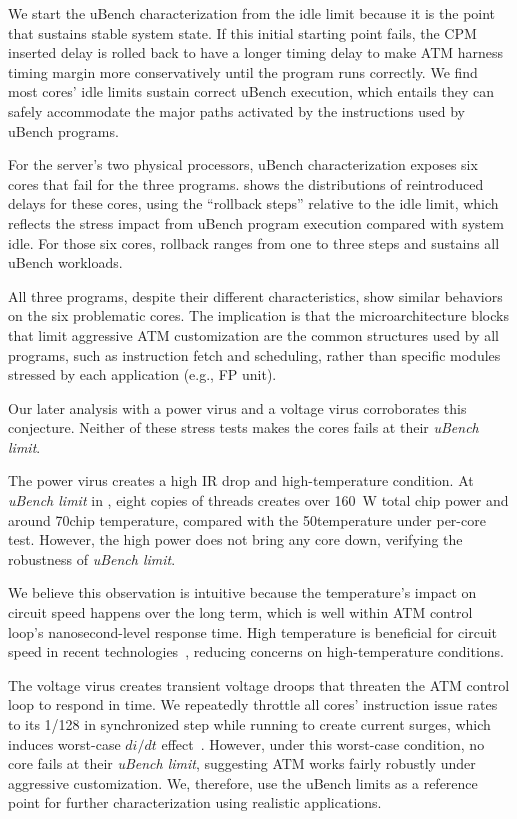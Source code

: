 We start the uBench characterization from the idle limit because it is the point that sustains stable system state. If this initial starting point fails, the CPM inserted delay is rolled back to have a longer timing delay to make ATM harness timing margin more conservatively until the program runs correctly. We find most cores' idle limits sustain correct uBench execution, which entails they can safely accommodate the major paths activated by the instructions used by uBench programs. 

For the server's two physical processors, uBench characterization exposes six cores that fail for the three programs.  shows the distributions of reintroduced delays for these cores, using the ``rollback steps'' relative to the idle limit, which reflects the stress impact from uBench program execution compared with system idle. For those six cores, rollback ranges from one to three steps and sustains all uBench workloads.

All three programs, despite their different characteristics, show similar behaviors on the six problematic cores. The implication is that the microarchitecture blocks that limit aggressive ATM customization are the common structures used by all programs, such as instruction fetch and scheduling, rather than specific modules stressed by each application (e.g., FP unit).

Our later analysis with a power virus and a voltage virus corroborates this conjecture. Neither of these stress tests makes the cores fails at their \textit{uBench limit}.

The power virus creates a high IR drop and high-temperature condition. At \textit{uBench limit} in , eight copies of  threads creates over 160~W total chip power and around 70\C chip temperature, compared with the 50\C temperature under per-core test. However, the high power does not bring any core down, verifying the robustness of \textit{uBench limit}. 

We believe this observation is intuitive because the temperature's impact on circuit speed happens over the long term, which is well within ATM control loop's nanosecond-level response time. High temperature is beneficial for circuit speed in recent technologies~\cite{zu2016tistate}, reducing concerns on high-temperature conditions.

The voltage virus creates transient voltage droops that threaten the ATM control loop to respond in time. We repeatedly throttle all cores' instruction issue rates to its 1/128 in synchronized step while running  to create current surges, which induces worst-case $di/dt$ effect~\cite{lefurgy2011active, lefurgy2013active}. However, under this worst-case condition, no core fails at their \textit{uBench limit}, suggesting ATM works fairly robustly under aggressive customization. We, therefore, use the uBench limits as a reference point for further characterization using realistic applications.

